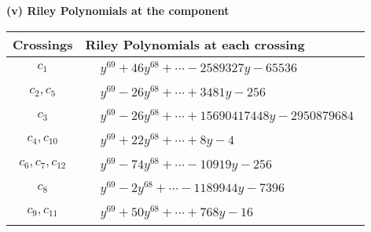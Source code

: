 \documentclass[1p]{elsarticle_modified}
\theoremstyle{definition}
\begin{document}
\flushleft \textbf{(v) Riley Polynomials at the component}\newline \\
\begin{tabular}{m{50pt}|m{274pt}}
Crossings & \hspace{64pt}Riley Polynomials at each crossing \\
\hline $$\begin{aligned}c_{1}\end{aligned}$$&$\begin{aligned}
&y^{69}+46 y^{68}+\cdots-2589327 y-65536
\end{aligned}$\\
\hline $$\begin{aligned}c_{2},c_{5}\end{aligned}$$&$\begin{aligned}
&y^{69}-26 y^{68}+\cdots+3481 y-256
\end{aligned}$\\
\hline $$\begin{aligned}c_{3}\end{aligned}$$&$\begin{aligned}
&y^{69}-26 y^{68}+\cdots+15690417448 y-2950879684
\end{aligned}$\\
\hline $$\begin{aligned}c_{4},c_{10}\end{aligned}$$&$\begin{aligned}
&y^{69}+22 y^{68}+\cdots+8 y-4
\end{aligned}$\\
\hline $$\begin{aligned}c_{6},c_{7},c_{12}\end{aligned}$$&$\begin{aligned}
&y^{69}-74 y^{68}+\cdots-10919 y-256
\end{aligned}$\\
\hline $$\begin{aligned}c_{8}\end{aligned}$$&$\begin{aligned}
&y^{69}-2 y^{68}+\cdots-1189944 y-7396
\end{aligned}$\\
\hline $$\begin{aligned}c_{9},c_{11}\end{aligned}$$&$\begin{aligned}
&y^{69}+50 y^{68}+\cdots+768 y-16
\end{aligned}$\\
\hline
\end{tabular}\\~\\
\end{document}
